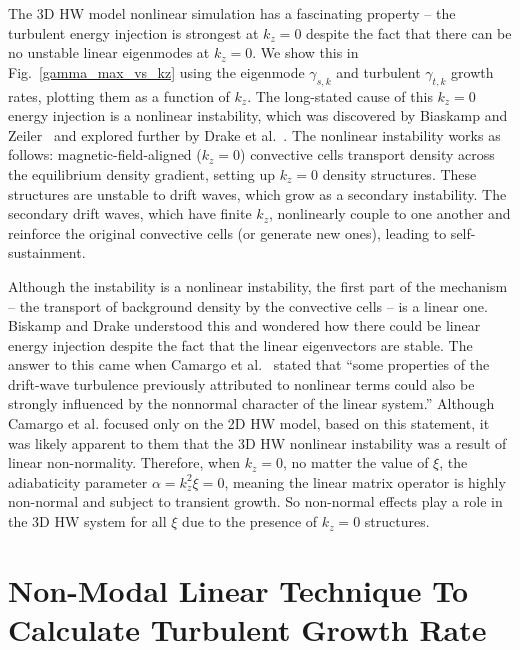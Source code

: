 \documentclass[letter,scriptaddress,twocolumn, prl,showkeys]{revtex4}
\begin{document}
The 3D HW model nonlinear simulation has a fascinating property -- the turbulent energy injection is strongest at $k_z = 0$ despite the fact that there can be no unstable linear eigenmodes at $k_z=0$.
We show this in Fig.~\ref{gamma_max_vs_kz} using the eigenmode $\gamma_{s,k}$ and turbulent $\gamma_{t,k}$ growth rates, plotting them as a function of $k_z$.
The long-stated cause of this $k_z=0$ energy injection is a nonlinear instability, which was discovered by Biaskamp and Zeiler~\cite{biskamp1995} and explored further by Drake et al.~\cite{drake1995}. 
The nonlinear instability works as follows: magnetic-field-aligned ($k_z=0$) convective cells transport density across the equilibrium density gradient, setting up $k_z=0$ density structures. 
These structures are unstable to drift waves, which grow as a secondary instability.
The secondary drift waves, which have finite $k_z$, nonlinearly couple to one another and reinforce the original convective cells (or generate new ones), leading to self-sustainment.

Although the instability is a nonlinear instability, the first part of the mechanism -- the transport of background density by the convective cells -- is a linear one.
Biskamp and Drake understood this and wondered how there could be linear energy injection despite the fact that the linear eigenvectors are stable.
The answer to this came when Camargo et al.~\cite{camargo1998} stated that ``some properties of the drift-wave turbulence
previously attributed to nonlinear terms could also be strongly influenced by the nonnormal character of the linear system.'' Although Camargo et al. focused only on the 2D HW model,
based on this statement, it was likely apparent to them that the 3D HW nonlinear instability was a result of linear non-normality. 
Therefore, when $k_z=0$, no matter the value of $\xi$, the adiabaticity parameter $\alpha = k_z^2 \xi = 0$, meaning the linear matrix operator is highly non-normal and subject to transient growth.
So non-normal effects play a role in the 3D HW system for all $\xi$ due to the presence of $k_z=0$ structures.

\section{Non-Modal Linear Technique To Calculate Turbulent Growth Rate}
\end{document}
